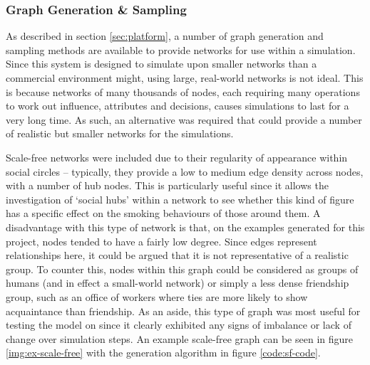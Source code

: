 \documentclass[]{report}
\begin{document}
\subsubsection{Graph Generation \& Sampling}
\label{sec:GGS}
As described in section \ref{sec:platform}, a number of graph generation and sampling methods are available to provide networks for use within a simulation. Since this system is designed to simulate upon smaller networks than a commercial environment might, using large, real-world networks is not ideal. This is because networks of many thousands of nodes, each requiring many operations to work out influence, attributes and decisions, causes simulations to last for a very long time. As such, an alternative was required that could provide a number of realistic but smaller networks for the simulations.

Scale-free networks were included due to their regularity of appearance within social circles – typically, they provide a low to medium edge density across nodes, with a number of hub nodes\cite{BASciAm}. This is particularly useful since it allows the investigation of `social hubs' within a network to see whether this kind of figure has a specific effect on the smoking behaviours of those around them. A disadvantage with this type of network is that, on the examples generated for this project, nodes tended to have a fairly low degree. Since edges represent relationships here, it could be argued that it is not representative of a realistic group. To counter this, nodes within this graph could be considered as groups of humans (and in effect a small-world network) or simply a less dense friendship group, such as an office of workers where ties are more likely to show acquaintance than friendship. As an aside, this type of graph was most useful for testing the model on since it clearly exhibited any signs of imbalance or lack of change over simulation steps. An example scale-free graph can be seen in figure \ref{img:ex-scale-free} with the generation algorithm in figure \ref{code:sf-code}.
\end{document}
